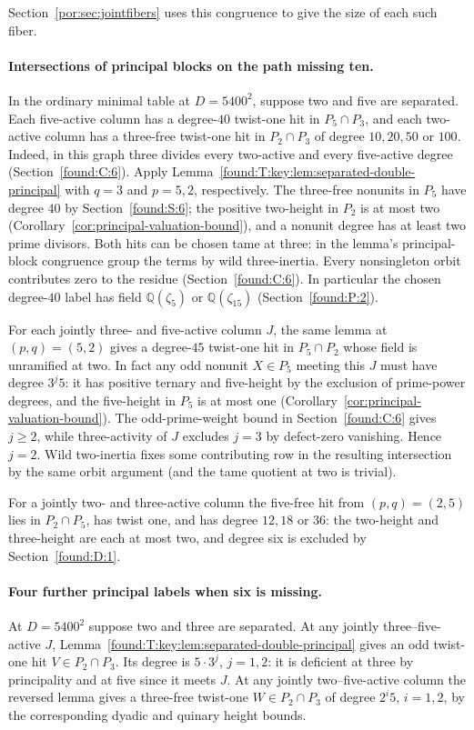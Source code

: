 \documentclass[11pt,a4paper]{article}
\numberwithin{equation}{section}
\theoremstyle{remark}
\begin{document}
Section~\ref{por:sec:jointfibers} uses this congruence to give the size of each such fiber.

\paragraph{Intersections of principal blocks on the path missing ten.}\label{por:double-missing-ten}
In the ordinary minimal table at $D=5400^2$, suppose two and five
are separated. Each five-active column has a degree-$40$ twist-one
hit in $P_5\cap P_3$, and each two-active column has a three-free
twist-one hit in $P_2\cap P_3$ of degree $10,20,50$ or $100$.
Indeed, in this graph three divides every two-active and every five-active degree (Section~\ref{found:C:6}).
Apply Lemma~\ref{found:T:key:lem:separated-double-principal} with $q=3$
and $p=5,2$, respectively. The three-free nonunits in $P_5$ have degree $40$ by Section~\ref{found:S:6}; the positive two-height in $P_2$
is at most two (Corollary~\ref{cor:principal-valuation-bound}), and a nonunit degree has at
least two prime divisors. Both hits can be chosen tame at three:
in the lemma's principal-block congruence group the terms by wild
three-inertia. Every nonsingleton orbit contributes zero to the residue (Section~\ref{found:C:6}). In particular the chosen degree-$40$ label
has field $\mathbb Q(\zeta_5)$ or $\mathbb Q(\zeta_{15})$ (Section~\ref{found:P:2}).

For each jointly three- and five-active column $J$, the same lemma
at $(p,q)=(5,2)$ gives a degree-$45$ twist-one hit in
$P_5\cap P_2$ whose field is unramified at two. In fact any odd
nonunit $X\in P_5$ meeting this $J$ must have degree $3^j5$: it
has positive ternary and five-height by the exclusion of
prime-power degrees, and the five-height in $P_5$ is at most one (Corollary~\ref{cor:principal-valuation-bound}). The odd-prime-weight bound in Section~\ref{found:C:6} gives $j\ge2$, while three-activity of $J$ excludes
$j=3$ by defect-zero vanishing. Hence $j=2$. Wild two-inertia fixes
some contributing row in the resulting intersection by the same
orbit argument (and the tame quotient at two is trivial).

For a jointly two- and three-active column the five-free hit from
$(p,q)=(2,5)$ lies in $P_2\cap P_5$, has twist one, and has degree
$12,18$ or $36$: the two-height and three-height are each at most
two, and degree six is excluded by Section~\ref{found:D:1}.

\paragraph{Four further principal labels when six is missing.}\label{por:four-neutral}
At $D=5400^2$ suppose two and three are separated. At any jointly
three--five-active $J$, Lemma~\ref{found:T:key:lem:separated-double-principal}
gives an odd twist-one hit $V\in P_2\cap P_3$. Its degree is
$5\cdot3^j$, $j=1,2$: it is deficient at three by principality
and at five since it meets $J$. At any jointly two--five-active
column the reversed lemma gives a three-free twist-one
$W\in P_2\cap P_3$ of degree $2^i5$, $i=1,2$, by the corresponding
dyadic and quinary height bounds.
\end{document}
